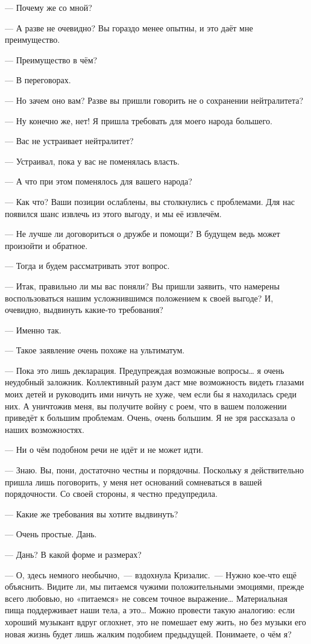 \documentclass[twoside,a5paper,12pt]{extbook}
\begin{document}
— Почему же со мной?

— А разве не очевидно? Вы гораздо менее опытны, и это даёт мне преимущество.

— Преимущество в чём?

— В переговорах.

— Но зачем оно вам? Разве вы пришли говорить не о сохранении нейтралитета?

— Ну конечно же, нет! Я пришла требовать для моего народа большего.

— Вас не устраивает нейтралитет?

— Устраивал, пока у вас не поменялась власть.

— А что при этом поменялось для вашего народа?

— Как что? Ваши позиции ослаблены, вы столкнулись с проблемами. Для нас появился шанс извлечь из этого выгоду, и мы её извлечём.

— Не лучше ли договориться о дружбе и помощи? В будущем ведь может произойти и обратное.

— Тогда и будем рассматривать этот вопрос.

— Итак, правильно ли мы вас поняли? Вы пришли заявить, что намерены воспользоваться нашим усложнившимся положением к своей выгоде? И, очевидно, выдвинуть какие-то требования?

— Именно так.

— Такое заявление очень похоже на ультиматум.

— Пока это лишь декларация. Предупреждая возможные вопросы… я очень неудобный заложник. Коллективный разум даст мне возможность видеть глазами моих детей и руководить ими ничуть не хуже, чем если бы я находилась среди них. А уничтожив меня, вы получите войну с роем, что в вашем положении приведёт к большим проблемам. Очень, очень большим. Я не зря рассказала о наших возможностях.

— Ни о чём подобном речи не идёт и не может идти.

— Знаю. Вы, пони, достаточно честны и порядочны. Поскольку я действительно пришла лишь поговорить, у меня нет оснований сомневаться в вашей порядочности. Со своей стороны, я честно предупредила. 

— Какие же требования вы хотите выдвинуть?

— Очень простые. Дань.

— Дань? В какой форме и размерах?

— О, здесь немного необычно, — вздохнула Кризалис. — Нужно кое-что ещё объяснить. Видите ли, мы питаемся чужими положительными эмоциями, прежде всего любовью, но «питаемся» не совсем точное выражение… Материальная пища поддерживает наши тела, а это… Можно провести такую аналогию: если хороший музыкант вдруг оглохнет, это не помешает ему жить, но без музыки его новая жизнь будет лишь жалким подобием предыдущей. Понимаете, о чём я?
\end{document}
